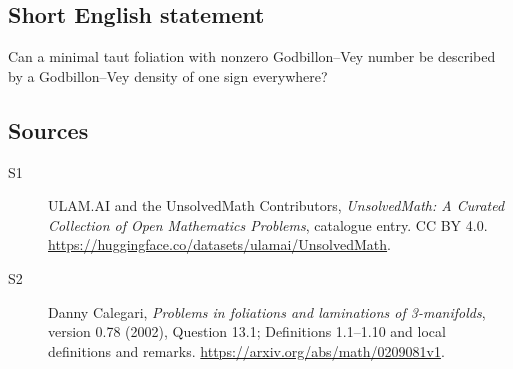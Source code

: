 \documentclass[11pt]{article}
\begin{document}
\subsection{Short English statement}
Can a minimal taut foliation with nonzero Godbillon--Vey number be described by a Godbillon--Vey density of one sign everywhere?
\subsection{Sources}
\begin{description}
\item[\hypertarget{source:statement:1}{S1}] ULAM.AI and the UnsolvedMath Contributors, \emph{UnsolvedMath: A Curated Collection of Open Mathematics Problems}, catalogue entry. CC BY 4.0. \url{https://huggingface.co/datasets/ulamai/UnsolvedMath}.
\item[\hypertarget{source:statement:2}{S2}] Danny Calegari, \emph{Problems in foliations and laminations of 3-manifolds}, version 0.78 (2002), Question 13.1; Definitions 1.1--1.10 and local definitions and remarks. \url{https://arxiv.org/abs/math/0209081v1}.
\end{description}
\label{end:statement}
\end{document}
